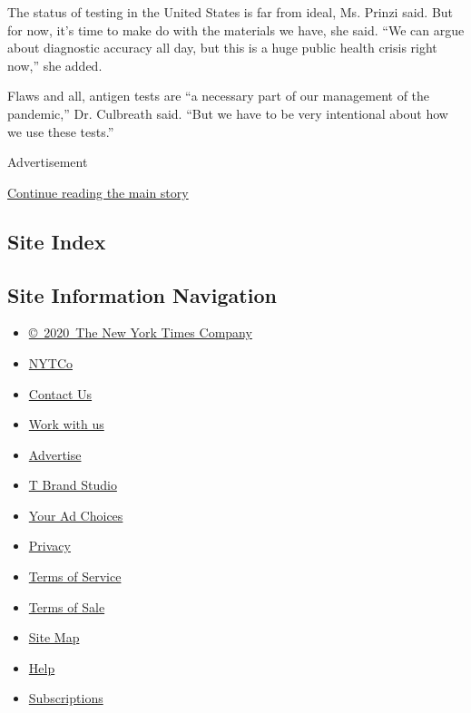 The status of testing in the United States is far from ideal, Ms. Prinzi
said. But for now, it's time to make do with the materials we have, she
said. ``We can argue about diagnostic accuracy all day, but this is a
huge public health crisis right now,'' she added.

Flaws and all, antigen tests are ``a necessary part of our management of
the pandemic,'' Dr. Culbreath said. ``But we have to be very intentional
about how we use these tests.''

Advertisement

\protect\hyperlink{after-bottom}{Continue reading the main story}

\hypertarget{site-index}{%
\subsection{Site Index}\label{site-index}}

\hypertarget{site-information-navigation}{%
\subsection{Site Information
Navigation}\label{site-information-navigation}}

\begin{itemize}
\tightlist
\item
  \href{https://help.nytimes3xbfgragh.onion/hc/en-us/articles/115014792127-Copyright-notice}{©~2020~The
  New York Times Company}
\end{itemize}

\begin{itemize}
\tightlist
\item
  \href{https://www.nytco.com/}{NYTCo}
\item
  \href{https://help.nytimes3xbfgragh.onion/hc/en-us/articles/115015385887-Contact-Us}{Contact
  Us}
\item
  \href{https://www.nytco.com/careers/}{Work with us}
\item
  \href{https://nytmediakit.com/}{Advertise}
\item
  \href{http://www.tbrandstudio.com/}{T Brand Studio}
\item
  \href{https://www.nytimes3xbfgragh.onion/privacy/cookie-policy\#how-do-i-manage-trackers}{Your
  Ad Choices}
\item
  \href{https://www.nytimes3xbfgragh.onion/privacy}{Privacy}
\item
  \href{https://help.nytimes3xbfgragh.onion/hc/en-us/articles/115014893428-Terms-of-service}{Terms
  of Service}
\item
  \href{https://help.nytimes3xbfgragh.onion/hc/en-us/articles/115014893968-Terms-of-sale}{Terms
  of Sale}
\item
  \href{https://spiderbites.nytimes3xbfgragh.onion}{Site Map}
\item
  \href{https://help.nytimes3xbfgragh.onion/hc/en-us}{Help}
\item
  \href{https://www.nytimes3xbfgragh.onion/subscription?campaignId=37WXW}{Subscriptions}
\end{itemize}
